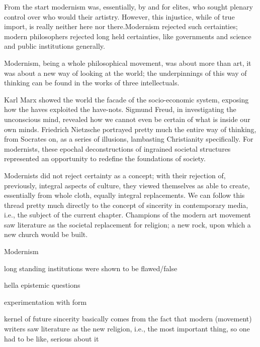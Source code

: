 \documentclass[../butidigress.tex]{subfiles}
\begin{document}
From the start modernism was, essentially, by and for elites\autocite[2]{cambridgemodern}, who sought plenary control over who would  their artistry.
However, this injustice, while of true import, is really neither here nor there.Modernism rejected such certainties; modern philosophers rejected long held certainties, like governments and science and public institutions generally.

Modernism, being a whole philosophical movement, was about more than art, it was about a new way of looking at the world; the underpinnings of this way of thinking can be found in the works of three intellectuals\autocite[9]{cambridgemodern}.

Karl Marx showed the world the facade of the socio-economic system, exposing how the haves exploited the have-nots.
Sigmund Freud, in investigating the unconscious mind, revealed how we cannot even be certain of what is inside our own minds.
Friedrich Nietzsche portrayed pretty much the entire  way of thinking, from Socrates on, as a series of illusions, lambasting Christianity specifically.
For modernists, these epochal deconstructions of ingrained societal structures represented an opportunity to redefine the foundations of society.

Modernists did not reject certainty as a concept; with their rejection of, previously, integral aspects of culture, they viewed themselves as able to create, essentially from whole cloth, equally integral replacements.
We can follow this thread pretty much directly to the concept of sincerity in contemporary media, i.e., the subject of the current chapter.
Champions of the modern art movement saw literature as the societal replacement for religion; a new rock, upon which a new church would be built.

\begin{somenotes}{Modernism}
    \item long standing institutions were shown to be flawed/false
    \item hella epistemic questions
    \item experimentation with form
    \item kernel of future sincerity basically comes from the fact that modern (movement) writers saw literature as the new religion, i.e., the most important thing, so one had to be like, serious about it
\end{somenotes}
\end{document}
